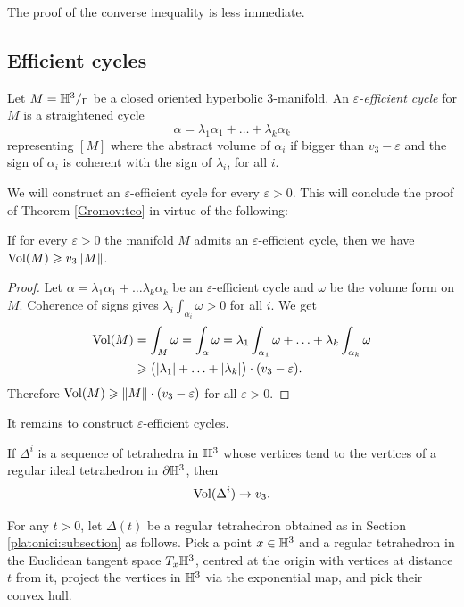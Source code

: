 The proof of the converse inequality is less immediate.

\subsection{Efficient cycles} \label{efficienti:subsection}
Let $M=\mathbb{H}^3/_\Gamma$ be a closed oriented hyperbolic 3-manifold. 
An \emph{$\varepsilon$-efficient cycle} for $M$ is a straightened cycle
$$\alpha = \lambda_1\alpha_1 + \ldots + \lambda_k\alpha_k$$
representing $[M]$ where the abstract volume of $\alpha_i$ if bigger than $v_3-\varepsilon$ and the sign of $\alpha_i$ is coherent with the sign of $\lambda_i$, for all $i$.

We will construct an $\varepsilon$-efficient cycle for every $\varepsilon >0$. This will conclude the proof of Theorem \ref{Gromov:teo} in virtue of the following:

\begin{lemma}
If for every $\varepsilon>0$ the manifold $M$ admits an $\varepsilon$-efficient cycle, then we have ${\rm Vol}(M) \geqslant v_3 \|M\|$.
\end{lemma}
\begin{proof}
Let $\alpha = \lambda_1\alpha_1 + \ldots \lambda_k\alpha_k$ be an $\varepsilon$-efficient cycle and $\omega$ be the volume form on $M$. Coherence of signs gives $\lambda_i\int_{\alpha_i}\omega>0$ for all $i$.
We get
\begin{align*}
{\rm Vol}(M) & = \int_M \omega = \int_\alpha \omega = \lambda_1 \int_{\alpha_1} \omega + \ldots + \lambda_k \int_{\alpha_k} \omega  \\
& \geqslant \big(|\lambda_1| + \ldots + |\lambda_k|\big) \cdot (v_3 - \varepsilon).
\end{align*}
Therefore ${\rm Vol}(M) \geqslant \|M\| \cdot (v_3 - \varepsilon)$ for all $\varepsilon > 0$.
\end{proof}

It remains to construct $\varepsilon$-efficient cycles.

\begin{ex} \label{volume:continuo:ex}
If $\Delta^i$ is a sequence of tetrahedra in $\mathbb{H}^3$ whose vertices tend to the vertices of a regular ideal tetrahedron in $\partial\mathbb{H}^3$, then
$${\rm Vol}(\Delta^i)\to v_3.$$
\end{ex}

For any $t>0$, let $\Delta(t)$ be a regular tetrahedron obtained as in Section \ref{platonici:subsection} as follows.
Pick a point $x\in \mathbb{H}^3$ and a regular tetrahedron in the Euclidean tangent space $T_x\mathbb{H}^3$, centred at the origin with vertices at distance $t$ from it, project the vertices in $\mathbb{H}^3$ via the exponential map, and pick their convex hull.

